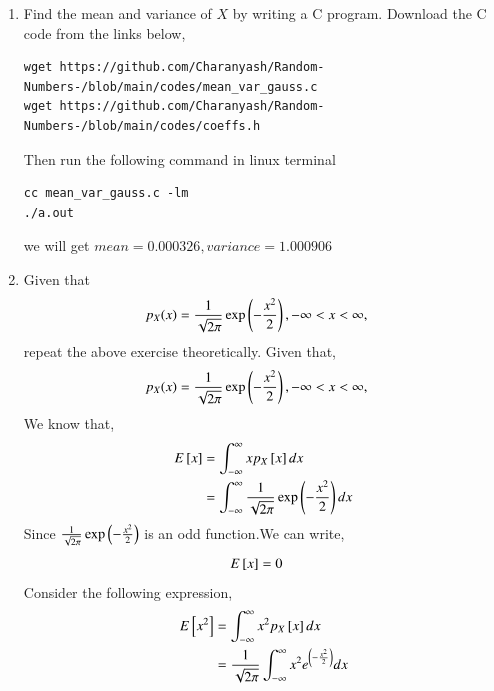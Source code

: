 \documentclass[journal,12pt,twocolumn]{IEEEtran}
\renewcommand\thesection{\arabic{section}}
\begin{document}
\begin{enumerate}[label=\thesection.\arabic*
,ref=\thesection.\theenumi]
\begin{figure}
\caption{The PDF of $X$}
\label{fig:gauss_pdf}
\end{figure}
\textbf{Properties of PDF:}
\begin{enumerate}
     \item PDF is symmetric about the mean, in this case at $x=0$
     \item It has bell shaped graph.
     \item The maxima of the curve is observed at mean of distribution.
\end{enumerate}	     

\item Find the mean and variance of $X$ by writing a C program.
\solution Download the C code from the links below,
\begin{lstlisting}
wget https://github.com/Charanyash/Random-Numbers-/blob/main/codes/mean_var_gauss.c
wget https://github.com/Charanyash/Random-Numbers-/blob/main/codes/coeffs.h
\end{lstlisting}
Then run the following command in linux terminal
\begin{lstlisting}
cc mean_var_gauss.c -lm
./a.out
\end{lstlisting}
we will get $mean = 0.000326, variance = 1.000906$
\item Given that 
\begin{align}
p_{X}(x) &= \frac{1}{\sqrt{2\pi}}\exp\left(-\frac{x^2}{2}\right), -\infty < x < \infty,
\end{align}
repeat the above exercise theoretically.
\solution Given that,
 \begin{align}
p_{X}(x) &= \frac{1}{\sqrt{2\pi}}\exp\left(-\frac{x^2}{2}\right), -\infty < x < \infty,
 \end{align} 
 We know that,
   \begin{align}
	   E{}\left[x\right] &= \int_{-\infty}^{\infty}xp_{X}{}\left[x\right]dx\\
	              &= \int_{-\infty}^{\infty}\frac{1}{\sqrt{2\pi}}\exp\left(-\frac{x^2}{2}\right)dx
   \end{align}
 Since $\frac{1}{\sqrt{2\pi}}\exp\left(-\frac{x^2}{2}\right)$ is an odd function.We can write,
   \begin{align}
	   E{}\left[x\right] &= 0 \label{eq:2-3}
   \end{align}
 Consider the following expression,
   \begin{align}
	   E\sbrak{x^{2}} &= \int_{-\infty}^{\infty}x^{2}p_{X}\sbrak{x}dx\\
	                         &=\frac{1}{\sqrt{2\pi}}\int_{-\infty}^{\infty}x^{2}e^{\brak{-\frac{x^2}{2}}}dx

\end{align}
\end{enumerate}
\end{document}
